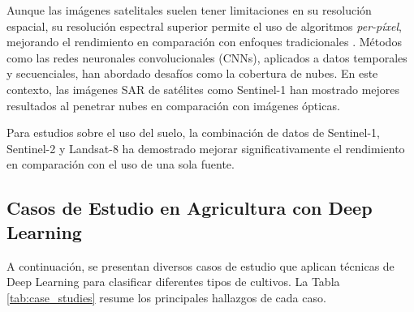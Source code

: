 Aunque las imágenes satelitales suelen tener limitaciones en su resolución espacial, su resolución espectral superior permite el uso de algoritmos \textit{per-píxel}, mejorando el rendimiento en comparación con enfoques tradicionales \cite{victor2022}.  Métodos como las redes neuronales convolucionales (CNNs), aplicados a datos temporales y secuenciales, han abordado desafíos como la cobertura de nubes. En este contexto, las imágenes SAR de satélites como Sentinel-1 han mostrado mejores resultados al penetrar nubes en comparación con imágenes ópticas.

Para estudios sobre el uso del suelo, la combinación de datos de Sentinel-1, Sentinel-2 y Landsat-8 ha demostrado mejorar significativamente el rendimiento en comparación con el uso de una sola fuente.

\subsection{Casos de Estudio en Agricultura con Deep Learning}

A continuación, se presentan diversos casos de estudio que aplican técnicas de Deep Learning para clasificar diferentes tipos de cultivos. La Tabla \ref{tab:case_studies} resume los principales hallazgos de cada caso.

